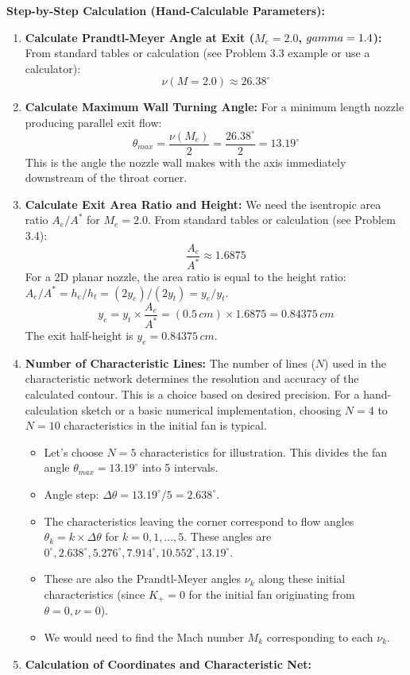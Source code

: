 \textbf{Step-by-Step Calculation (Hand-Calculable Parameters):}

\begin{enumerate}
\def\labelenumi{\arabic{enumi}.}
\item
  \textbf{Calculate Prandtl-Meyer Angle at Exit (\(M_e = 2.0\),
  \(\\gamma = 1.4\)):} From standard tables or calculation (see Problem
  3.3 example or use a calculator): \[ \nu(M=2.0) \approx 26.38^\circ \]
\item
  \textbf{Calculate Maximum Wall Turning Angle:} For a minimum length
  nozzle producing parallel exit flow:
  \[ \theta_{max} = \frac{\nu(M_e)}{2} = \frac{26.38^\circ}{2} = 13.19^\circ \]
  This is the angle the nozzle wall makes with the axis immediately
  downstream of the throat corner.
\item
  \textbf{Calculate Exit Area Ratio and Height:} We need the isentropic
  area ratio \(A_e / A^*\) for \(M_e = 2.0\). From standard tables or
  calculation (see Problem 3.4): \[ \frac{A_e}{A^*} \approx 1.6875 \]
  For a 2D planar nozzle, the area ratio is equal to the height ratio:
  \(A_e/A^* = h_e/h_t = (2y_e)/(2y_t) = y_e/y_t\).
  \[ y_e = y_t \times \frac{A_e}{A^*} = (0.5 \, cm) \times 1.6875 = 0.84375 \, cm \]
  The exit half-height is \(y_e = 0.84375 \, cm\).
\item
  \textbf{Number of Characteristic Lines:} The number of lines (\(N\))
  used in the characteristic network determines the resolution and
  accuracy of the calculated contour. This is a choice based on desired
  precision. For a hand-calculation sketch or a basic numerical
  implementation, choosing \(N=4\) to \(N=10\) characteristics in the
  initial fan is typical.

  \begin{itemize}
  \tightlist
  \item
    Let's choose \(N=5\) characteristics for illustration. This divides
    the fan angle \(\theta_{max} = 13.19^\circ\) into 5 intervals.
  \item
    Angle step: \(\Delta\theta = 13.19^\circ / 5 = 2.638^\circ\).
  \item
    The characteristics leaving the corner correspond to flow angles
    \(\theta_k = k \times \Delta\theta\) for \(k=0, 1, ..., 5\). These
    angles are
    \(0^\circ, 2.638^\circ, 5.276^\circ, 7.914^\circ, 10.552^\circ, 13.19^\circ\).
  \item
    These are also the Prandtl-Meyer angles \(\nu_k\) along these
    initial characteristics (since \(K_+=0\) for the initial fan
    originating from \(\theta=0, \nu=0\)).
  \item
    We would need to find the Mach number \(M_k\) corresponding to each
    \(\nu_k\).
  \end{itemize}
\item
  \textbf{Calculation of Coordinates and Characteristic Net:}


\end{enumerate}
